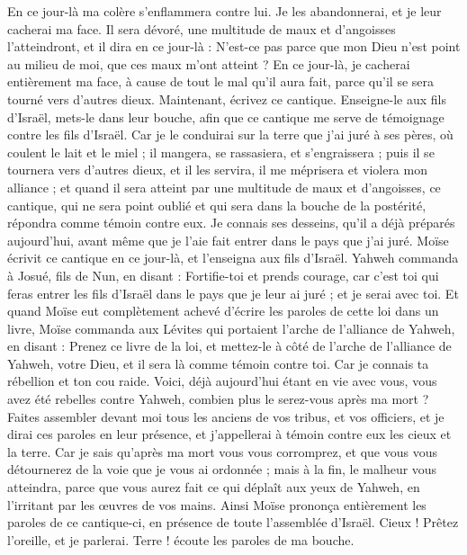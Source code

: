 \begin{multicols}{2}
En ce jour-là ma colère s'enflammera contre lui. Je les abandonnerai, et je leur cacherai ma face. Il sera dévoré, une multitude de maux et d’angoisses l’atteindront, et il dira en ce jour-là : N'est-ce pas parce que mon Dieu n'est point au milieu de moi, que ces maux m'ont atteint ?
En ce jour-là, je cacherai entièrement ma face, à cause de tout le mal qu'il aura fait, parce qu'il se sera tourné vers d'autres dieux.
Maintenant, écrivez ce cantique. Enseigne-le aux fils d'Israël, mets-le dans leur bouche, afin que ce cantique me serve de témoignage contre les fils d'Israël.
Car je le conduirai sur la terre que j'ai juré à ses pères, où coulent le lait et le miel ; il mangera, se rassasiera, et s’engraissera ; puis il se tournera vers d'autres dieux, et il les servira, il me méprisera et violera mon alliance ;
et quand il sera atteint par une multitude de maux et d’angoisses, ce cantique, qui ne sera point oublié et qui sera dans la bouche de la postérité, répondra comme témoin contre eux. Je connais ses desseins, qu'il a déjà préparés aujourd'hui, avant même que je l’aie fait entrer dans le pays que j'ai juré.
Moïse écrivit ce cantique en ce jour-là, et l'enseigna aux fils d'Israël.
Yahweh commanda à Josué, fils de Nun, en disant : Fortifie-toi et prends courage, car c'est toi qui feras entrer les fils d'Israël dans le pays que je leur ai juré ; et je serai avec toi.
Et quand Moïse eut complètement achevé d'écrire les paroles de cette loi dans un livre,
Moïse commanda aux Lévites qui portaient l'arche de l'alliance de Yahweh, en disant :
Prenez ce livre de la loi, et mettez-le à côté de l'arche de l'alliance de Yahweh, votre Dieu, et il sera là comme témoin contre toi.
Car je connais ta rébellion et ton cou raide. Voici, déjà aujourd'hui étant en vie avec vous, vous avez été rebelles contre Yahweh, combien plus le serez-vous après ma mort ?
Faites assembler devant moi tous les anciens de vos tribus, et vos officiers, et je dirai ces paroles en leur présence, et j'appellerai à témoin contre eux les cieux et la terre.
Car je sais qu'après ma mort vous vous corromprez, et que vous vous détournerez de la voie que je vous ai ordonnée ; mais à la fin, le malheur vous atteindra, parce que vous aurez fait ce qui déplaît aux yeux de Yahweh, en l'irritant par les œuvres de vos mains.
Ainsi Moïse prononça entièrement les paroles de ce cantique-ci, en présence de toute l'assemblée d'Israël.
\VerseOne{}Cieux ! Prêtez l'oreille, et je parlerai. Terre ! écoute les paroles de ma bouche.

\end{multicols}
